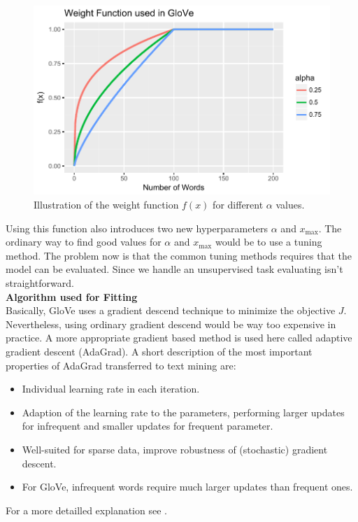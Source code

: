 \begin{figure}[!h]
\centering
\includegraphics[scale=0.8]{images/weight_fun.pdf} 
\caption[Weight function used in GloVe.]{Illustration of the weight function $f(x)$ for different $\alpha$ values.}
\label{fig:wf}
\end{figure}

Using this function also introduces two new hyperparameters $\alpha$ and 
$x_\mathrm{max}$. The ordinary way to find good values for $\alpha$ and 
$x_\mathrm{max}$ would be to use a tuning method. The problem now is that the common tuning methods requires that the model can be evaluated. Since we handle an
unsupervised task evaluating isn't straightforward. \\

\textbf{Algorithm used for Fitting} \\

Basically, GloVe uses a gradient descend technique to minimize the objective 
$J$. Nevertheless, using ordinary gradient descend would be way too expensive
in practice. A more appropriate gradient based method is used here called adaptive 
gradient descent (AdaGrad). A short description of the most important properties of 
AdaGrad transferred to text mining are:

\begin{itemize}
  \item
    Individual learning rate in each iteration.

  \item 
    Adaption of the learning rate to the parameters, performing larger updates 
    for infrequent and smaller updates for frequent parameter.

  \item 
    Well-suited for sparse data, improve robustness of (stochastic) gradient 
    descent.
  
  \item 
    For GloVe, infrequent words require much larger updates than frequent ones.
\end{itemize}

For a more detailled explanation see \cite{ruder2016overview}.